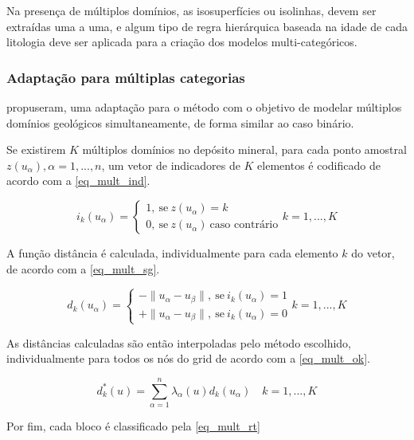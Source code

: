 Na presença de múltiplos domínios, as isosuperfícies ou isolinhas, devem ser extraídas uma a uma, e algum tipo de regra hierárquica baseada na idade de cada litologia deve ser aplicada para a criação dos modelos multi-categóricos.

\subsubsection{Adaptação para múltiplas categorias}

 propuseram, uma adaptação para o método com o objetivo de modelar múltiplos domínios geológicos simultaneamente, de forma similar ao caso binário.

Se existirem $K$ múltiplos domínios no depósito mineral, para cada ponto amostral ${z(u_\alpha),\alpha=1,...,n}$, um vetor de indicadores de $K$ elementos é codificado de acordo com a \autoref{eq_mult_ind}.

\begin{equation}
	i_k(u_\alpha)=\begin{cases}
	1,\:\textrm{se}\:z(u_\alpha)=k\\
    0,\:\textrm{se}\:z(u_\alpha)\:\textrm{caso contrário}\end{cases} k=1,...,K
    \label{eq_mult_ind}
\end{equation}

A função distância é calculada, individualmente para cada elemento $k$ do vetor, de acordo com a \autoref{eq_mult_sg}.

\begin{equation}
	d_k(u_\alpha)=\begin{cases}
	-\parallel u_\alpha-u_\beta\parallel,\:\textrm{se}\:i_k(u_\alpha)=1\\
	+\parallel u_\alpha-u_\beta\parallel,\:\textrm{se}\:i_k(u_\alpha)=0\end{cases} k=1,...,K
    \label{eq_mult_sg}
\end{equation}

As distâncias calculadas são então interpoladas pelo método escolhido, individualmente para todos os nós do grid de acordo com a \autoref{eq_mult_ok}.

\begin{equation}
	d_k^*(u)=\sum\limits_{\alpha=1}^n \lambda_\alpha(u)d_k(u_\alpha)\quad k=1,...,K
    \label{eq_mult_ok}
\end{equation}

Por fim, cada bloco é  classificado pela \autoref{eq_mult_rt}


